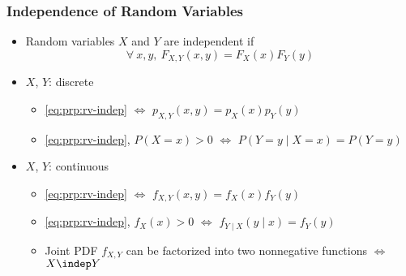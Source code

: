 \subsubsection*{Independence of Random Variables}
\begin{itemize}
    \item Random variables $X$ and $Y$ are independent if
    \begin{equation}\label{eq:prp:rv-indep}
        \forall~x,y,~F_{X,Y}(x,y)=F_X(x)F_Y(y)
    \end{equation}
    \item $X$, $Y$: discrete
    \begin{itemize}
        \item \ref{eq:prp:rv-indep} $\iff$ $p_{X,Y}(x,y)=p_X(x)p_Y(y)$
        \item \ref{eq:prp:rv-indep}, $P(X=x)>0$ $\iff$ $P(Y=y\mid X=x)=P(Y=y)$
    \end{itemize}
    \item $X$, $Y$: continuous
    \begin{itemize}
        \item \ref{eq:prp:rv-indep} $\iff$ $f_{X,Y}(x,y)=f_X(x)f_Y(y)$
        \item \ref{eq:prp:rv-indep}, $f_X(x)>0$ $\iff$ $f_{Y\mid X}(y\mid x)=f_Y(y)$
        \item Joint PDF $f_{X,Y}$ can be factorized into two nonnegative functions $\iff$ $X\indep Y$
    \end{itemize}
\end{itemize}

